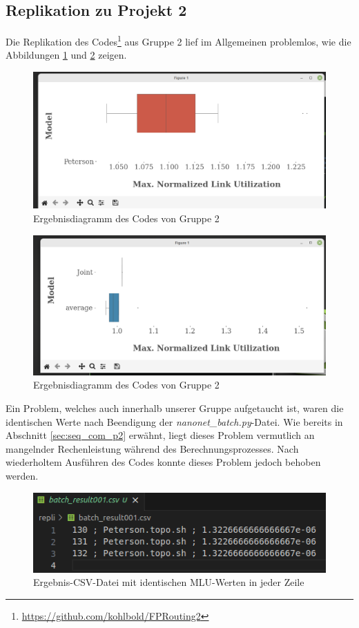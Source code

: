 \documentclass[sigconf, nonacm, review]{acmart}
\begin{document}
\subsection{Replikation zu Projekt 2}
Die Replikation des Codes\footnote{\url{https://github.com/kohlbold/FPRouting2}} aus Gruppe 2 lief im Allgemeinen problemlos, wie die Abbildungen \ref{fig:repl_p2_daniel2} und \ref{fig:repl_p2_zixiang_10} zeigen.
\begin{figure}
\centering
\includegraphics[width=\linewidth]{figures/repl_p2_daniel2.png}
\caption{Ergebnisdiagramm des Codes von Gruppe 2}
\label{fig:repl_p2_daniel2}
\end{figure}
\begin{figure}
\centering
\includegraphics[width=\linewidth]{figures/repl_p2_zixiang_10.png}
\caption{Ergebnisdiagramm des Codes von Gruppe 2}
\label{fig:repl_p2_zixiang_10}
\end{figure}
Ein Problem, welches auch innerhalb unserer Gruppe aufgetaucht ist,
waren die identischen Werte nach Beendigung der \emph{nanonet\_batch.py}-Datei.
Wie bereits in Abschnitt \ref{sec:seq_com_p2} erw\"ahnt, liegt dieses Problem vermutlich an mangelnder Rechenleistung w\"ahrend des Berechnungsprozesses.
Nach wiederholtem Ausf\"uhren des Codes konnte dieses Problem jedoch behoben werden.
\begin{figure}
\centering
\includegraphics[width=\linewidth]{figures/repl_p2_daniel1.png}
\caption{Ergebnis-CSV-Datei mit identischen MLU-Werten in jeder Zeile}
\label{fig:repl_p2_daniel1}
\end{figure}
\end{document}
